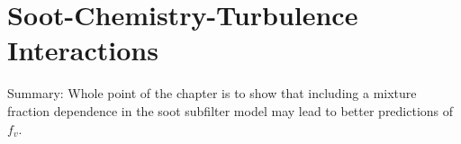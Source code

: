 \chapter{Soot-Chemistry-Turbulence Interactions\label{ch:subfilter}}

Summary: Whole point of the chapter is to show that including a mixture fraction dependence in the soot subfilter model may lead to better predictions of $f_v$.








